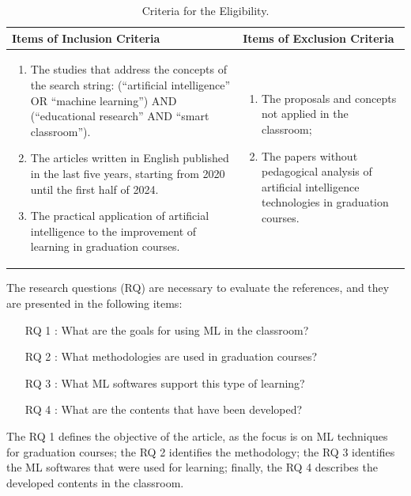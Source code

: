\documentclass[english]{textolivre}
\begin{document}
\begin{table}[ht]
\centering
\begin{threeparttable}
\caption{Criteria for the Eligibility.}
\label{tab02}
\begin{tabular}{
>{\raggedright\arraybackslash}p{} 
>{\raggedright\arraybackslash}p{}
}
\toprule
Items of Inclusion Criteria & Items of Exclusion Criteria \\
\midrule
\begin{enumerate}[label=\alph*)]
    \item The studies that address the concepts of the search string: (“artificial intelligence” OR “machine learning”) AND (“educational research” AND “smart classroom”).
    \item The articles written in English published in the last five years, starting from 2020 until the first half of 2024.
    \item The practical application of artificial intelligence to the improvement of learning in graduation courses.
\end{enumerate} &
\begin{enumerate}[label=\alph*)]
    \item The proposals and concepts not applied in the classroom;
    \item The papers without pedagogical analysis of artificial intelligence technologies in graduation courses.
\end{enumerate}
 \\
\bottomrule
\end{tabular}
\end{threeparttable}
\end{table}

The research questions (RQ) are necessary to evaluate the references,
and they are presented in the following items:
\begin{itemize}
    \item[RQ 1]: What are the goals for using ML in the classroom?
    \item[RQ 2]: What methodologies are used in graduation courses?
    \item[RQ 3]: What ML softwares support this type of learning?
    \item[RQ 4]: What are the contents that have been developed?
\end{itemize}
The RQ 1 defines the objective of the article, as the focus is on ML
techniques for graduation courses; the RQ 2 identifies the methodology;
the RQ 3 identifies the ML softwares that were used for learning;
finally, the RQ 4 describes the developed contents in the classroom.
\end{document}
